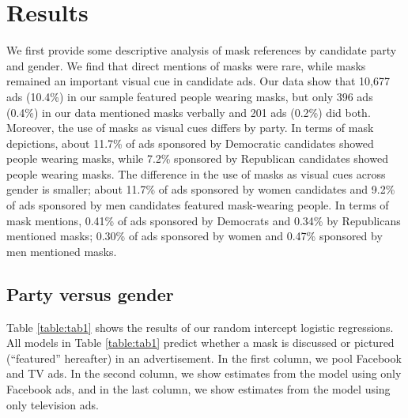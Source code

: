 \section*{Results}
We first provide some descriptive analysis of mask references by candidate party and gender. We find that direct mentions of masks were rare, while masks remained an important visual cue in candidate ads. Our data show that 10,677 ads (10.4\%) in our sample featured people wearing masks, but only 396 ads (0.4\%) in our data mentioned masks verbally and 201 ads (0.2\%) did both. Moreover, the use of masks as visual cues differs by party. In terms of mask depictions, about 11.7\% of ads sponsored by Democratic candidates showed people wearing masks, while 7.2\% sponsored by Republican candidates showed people wearing masks. The difference in the use of masks as visual cues across gender is smaller; about 11.7\% of ads sponsored by women candidates and 9.2\% of ads sponsored by men candidates featured mask-wearing people. In terms of mask mentions, 0.41\% of ads sponsored by Democrats and 0.34\% by Republicans mentioned masks; 0.30\% of ads sponsored by women and 0.47\% sponsored by men mentioned masks.

\subsection*{Party versus gender}
Table \ref{table:tab1} shows the results of our random intercept logistic regressions. All models in Table \ref{table:tab1} predict whether a mask is discussed or pictured (``featured'' hereafter) in an advertisement. In the first column, we pool Facebook and TV ads. In the second column, we show estimates from the model using only Facebook ads, and in the last column, we show estimates from the model using only television ads.


\begin{table}[!htbp]
    \caption{Random Intercept Logistic Regression Predicting Mask Reference}
\footnotesize
    \centering
    
    \label{table:tab1}
\end{table}

